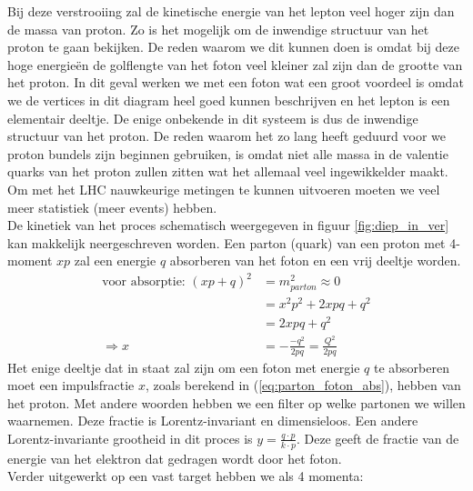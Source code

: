 \documentclass[../main.tex]{subfiles}
\begin{document}
Bij deze verstrooiing zal de kinetische energie van het lepton veel hoger zijn dan de massa van proton. Zo is het mogelijk om de inwendige structuur van het proton te gaan bekijken. De reden waarom we dit kunnen doen is omdat bij deze hoge energieën de golflengte van het foton veel kleiner zal zijn dan de grootte van het proton. In dit geval werken we met een foton wat een groot voordeel is omdat we de vertices in dit diagram heel goed kunnen beschrijven en het lepton is een elementair deeltje. De enige onbekende in dit systeem is dus de inwendige structuur van het proton. De reden waarom het zo lang heeft geduurd voor we proton bundels zijn beginnen gebruiken, is omdat niet alle massa in de valentie quarks van het proton zullen zitten wat het allemaal veel ingewikkelder maakt. Om met het LHC nauwkeurige metingen te kunnen uitvoeren moeten we veel meer statistiek (meer events) hebben.\\
De kinetiek van het proces schematisch weergegeven in figuur \ref{fig:diep_in_ver} kan makkelijk neergeschreven worden. Een parton (quark) van een proton met 4-moment $xp$ zal een energie $q$ absorberen van het foton en een vrij deeltje worden.
\begin{equation}
    \begin{aligned}
        \label{eq:parton_foton_abs}
        \text{voor absorptie: }(xp+q)^2 &= m_{parton}^2 \approx 0\\
                                        &=x^2p^2+2xpq+q^2\\
                                        &=2xpq+q^2\\
                          \Rightarrow x &=- \frac{-q^2}{2pq} = \frac{Q^2}{2pq} 
    \end{aligned}
\end{equation}
Het enige deeltje dat in staat zal zijn om een foton met energie $q$ te absorberen moet een impulsfractie $x$, zoals berekend in (\ref{eq:parton_foton_abs}), hebben van het proton. Met andere woorden hebben we een filter op welke partonen we willen waarnemen. Deze fractie is Lorentz-invariant en dimensieloos. Een andere Lorentz-invariante grootheid in dit proces is $y=\frac{q\cdot p}{k\cdot p}$. Deze geeft de fractie van de energie van het elektron dat gedragen wordt door het foton.\\
Verder uitgewerkt op een vast target hebben we als 4 momenta:
\end{document}
